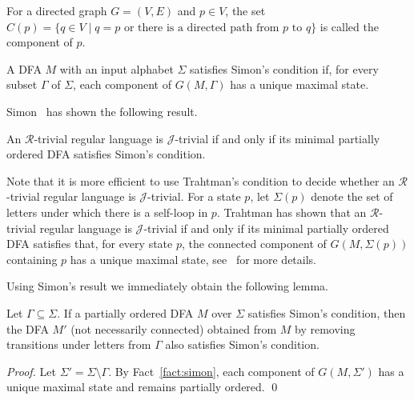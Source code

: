 \documentclass[runningheads]{llncs}
\newcommand{\R}{$\mathcal{R}$}
\newcommand{\J}{$\mathcal{J}$}
\begin{document}
  For a directed graph $G=(V,E)$ and $p\in V$, the set 
  $C(p) = \{q\in V \mid q=p \text{ or there is a directed path from } p \text{ to } q\}$
  is called the component of $p$.

  \begin{definition}
    A DFA $M$ with an input alphabet $\Sigma$
    satisfies Simon's condition
    if, for every subset $\Gamma$ of $\Sigma$, each component of $G(M,\Gamma)$ has a unique maximal state.
  \end{definition}

  Simon~\cite{Simon1975} has shown the following result.
  \begin{fact}\label{st}\label{fact:simon}
    An \R-trivial regular language is \J-trivial if and only if its minimal partially ordered DFA satisfies Simon's condition.
  \end{fact}

  Note that it is more efficient to use Trahtman's condition to decide whether an \R-trivial regular language is \J-trivial. For a state $p$, let $\Sigma(p)$ denote the set of letters under which there is a self-loop in $p$. Trahtman has shown that an \R-trivial regular language is \J-trivial if and only if its minimal partially ordered DFA satisfies that, for every state $p$, the connected component of $G(M,\Sigma(p))$ containing $p$ has a unique maximal state, see~\cite{Trahtman2001} for more details.
  
  Using Simon's result we immediately obtain the following lemma.
  \begin{lemma}\label{lem:removing}
    Let  $\Gamma\subseteq\Sigma$.
    If a partially ordered DFA $M$ over $\Sigma$ satisfies Simon's condition, 
    then the DFA $M'$ (not necessarily connected) obtained from $M$
    by removing transitions under letters from $\Gamma$
    also satisfies Simon's condition.
  \end{lemma}
  \begin{proof}
    Let $\Sigma'=\Sigma\setminus\Gamma$.
    By Fact~\ref{fact:simon}, each component of $G(M,\Sigma')$ has a unique maximal state and remains partially ordered.
    \qed
  \end{proof}
\end{document}
